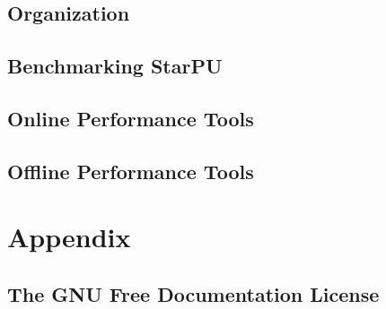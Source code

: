 %
%
%
%
%
\newcommand\starputitle{StarPU Handbook - StarPU Performances}
\setcounter{tocdepth}{2}


\chapter{Organization}
\label{index}
\hypertarget{index}{}


\chapter{Benchmarking StarPU}
\label{BenchmarkingStarPU}
\hypertarget{BenchmarkingStarPU}{}


\chapter{Online Performance Tools}
\label{OnlinePerformanceTools}
\hypertarget{OnlinePerformanceTools}{}


\chapter{Offline Performance Tools}
\label{OfflinePerformanceTools}
\hypertarget{OfflinePerformanceTools}{}


\part{Appendix}

\chapter{The GNU Free Documentation License}
\label{GNUFreeDocumentationLicense}
\hypertarget{GNUFreeDocumentationLicense}{}




